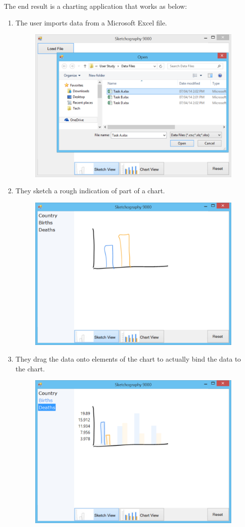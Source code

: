 The end result is a charting application that works as below:
\begin{enumerate}
\item The user imports data from a Microsoft Excel file.
	\begin{figure}[H]
	\centering
	\includegraphics[width=0.6\linewidth]{walk1}
	\end{figure}
\item They sketch a rough indication of part of a chart.
	\begin{figure}[H]
	\centering
	\includegraphics[width=0.6\linewidth]{walk2}
	\end{figure}
\item They drag the data onto elements of the chart to actually bind the data to the chart. 
	\begin{figure}[H]
	\centering
	\includegraphics[width=0.6\linewidth]{walk3}

\end{figure}
\end{enumerate}
